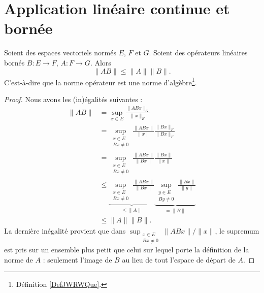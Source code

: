 \section{Application linéaire continue et bornée}

\begin{lemma}   \label{LEMooFITMooBBBWGI}
    Soient des espaces vectoriels normés \( E\), \( F\) et \( G\). Soient des opérateurs linéaires bornés \( B\colon E\to F\), \( A\colon F\to G\). Alors
    \begin{equation}
        \| AB \|\leq \| A \|\| B \|.
    \end{equation}
    C'est-à-dire que la norme opérateur est une norme d'algèbre\footnote{Définition \ref{DefJWRWQue}.}.
\end{lemma}

\begin{proof}
    Nous avons les (in)égalités suivantes :
    \begin{subequations}
        \begin{align}
            \| AB \|&=\sup_{x\in E}\frac{ \| ABx \|_G }{ \| x \|_E }\\
            &=\sup_{\substack{x\in E\\Bx\neq 0}}\frac{ \| ABx \| }{ \| x \| }\frac{ \| Bx \|_F }{ \| Bx \|_F }\\
            &=\sup_{\substack{x\in E\\Bx\neq 0}}\frac{ \| ABx \| }{ \| Bx \| }\frac{ \| Bx \| }{ \| x \| }\\
            &\leq\underbrace{\sup_{\substack{x\in E\\Bx\neq 0}}\frac{ \| ABx \| }{ \| Bx \| }}_{\leq\| A \|}\underbrace{\sup_{\substack{y\in E\\By\neq 0}}\frac{ \| Bx \| }{ \| y \| }}_{=\| B \|}\\
            &\leq \| A \|\| B \|.
        \end{align}
    \end{subequations}
    La dernière inégalité provient que dans \( \sup_{\substack{x\in E\\Bx\neq 0}}\| ABx \|/\| x \|\), le supremum est pris sur un ensemble plus petit que celui sur lequel porte la définition de la norme de \( A\) : seulement l'image de \( B\) au lieu de tout l'espace de départ de \( A\).
\end{proof}

